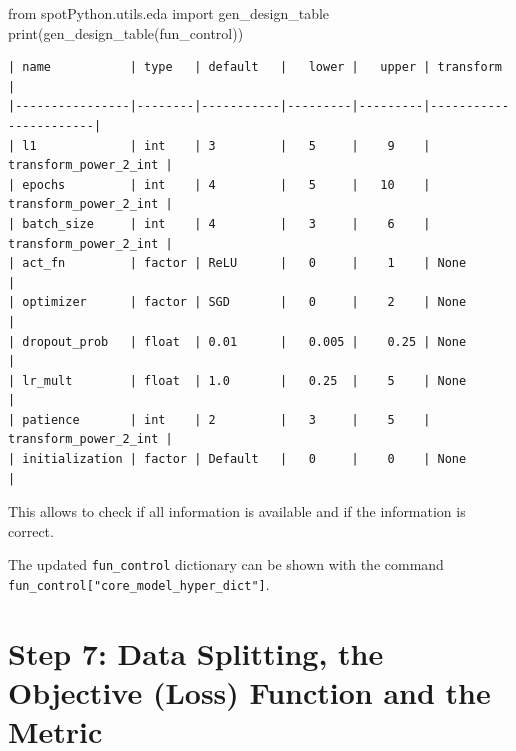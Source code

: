 \documentclass[
  letterpaper,
  DIV=11,
  numbers=noendperiod]{scrreprt}
\newenvironment{Shaded}{\begin{snugshade}}{\end{snugshade}}
\newcommand{\BuiltInTok}[1]{\textcolor[rgb]{0.00,0.23,0.31}{#1}}
\newcommand{\ImportTok}[1]{\textcolor[rgb]{0.00,0.46,0.62}{#1}}
\newcommand{\NormalTok}[1]{\textcolor[rgb]{0.00,0.23,0.31}{#1}}
\begin{document}
\begin{Shaded}
\begin{Highlighting}[]
\ImportTok{from}\NormalTok{ spotPython.utils.eda }\ImportTok{import}\NormalTok{ gen\_design\_table}
\BuiltInTok{print}\NormalTok{(gen\_design\_table(fun\_control))}
\end{Highlighting}
\end{Shaded}

\begin{verbatim}
| name           | type   | default   |   lower |   upper | transform             |
|----------------|--------|-----------|---------|---------|-----------------------|
| l1             | int    | 3         |   5     |    9    | transform_power_2_int |
| epochs         | int    | 4         |   5     |   10    | transform_power_2_int |
| batch_size     | int    | 4         |   3     |    6    | transform_power_2_int |
| act_fn         | factor | ReLU      |   0     |    1    | None                  |
| optimizer      | factor | SGD       |   0     |    2    | None                  |
| dropout_prob   | float  | 0.01      |   0.005 |    0.25 | None                  |
| lr_mult        | float  | 1.0       |   0.25  |    5    | None                  |
| patience       | int    | 2         |   3     |    5    | transform_power_2_int |
| initialization | factor | Default   |   0     |    0    | None                  |
\end{verbatim}

This allows to check if all information is available and if the
information is correct.

\begin{tcolorbox}[enhanced jigsaw, left=2mm, opacitybacktitle=0.6, leftrule=.75mm, toptitle=1mm, opacityback=0, colback=white, rightrule=.15mm, colframe=quarto-callout-note-color-frame, title=\textcolor{quarto-callout-note-color}{\faInfo}\hspace{0.5em}{Note: Hyperparameters of the Tuned Model and the \texttt{fun\_control}
Dictionary}, toprule=.15mm, coltitle=black, bottomrule=.15mm, bottomtitle=1mm, colbacktitle=quarto-callout-note-color!10!white, titlerule=0mm, breakable, arc=.35mm]

The updated \texttt{fun\_control} dictionary can be shown with the
command \texttt{fun\_control{[}"core\_model\_hyper\_dict"{]}}.

\end{tcolorbox}

\section{Step 7: Data Splitting, the Objective (Loss) Function and the
Metric}\label{step-7-data-splitting-the-objective-loss-function-and-the-metric-2}
\end{document}
